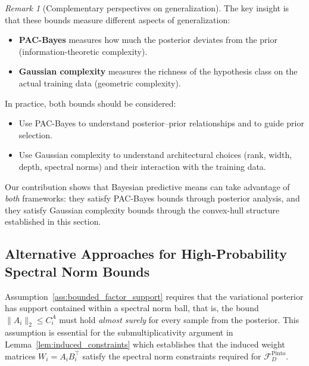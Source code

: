 \documentclass{article}
\theoremstyle{plain}
\theoremstyle{definition}
\theoremstyle{remark}
\newtheorem{remark}[theorem]{Remark}
\begin{document}
\begin{remark}[Complementary perspectives on generalization]
The key insight is that these bounds measure different aspects of generalization:
\begin{itemize}
    \item \textbf{PAC-Bayes} measures how much the posterior deviates from the prior (information-theoretic complexity).
    \item \textbf{Gaussian complexity} measures the richness of the hypothesis class on the actual training data (geometric complexity).
\end{itemize}
In practice, both bounds should be considered:
\begin{itemize}
    \item Use PAC-Bayes to understand posterior--prior relationships and to guide prior selection.
    \item Use Gaussian complexity to understand architectural choices (rank, width, depth, spectral norms) and their interaction with the training data.
\end{itemize}
Our contribution shows that Bayesian predictive means can take advantage of \emph{both} frameworks: they satisfy PAC-Bayes bounds through posterior analysis, and they satisfy Gaussian complexity bounds through the convex-hull structure established in this section.
\end{remark}



\subsection{Alternative Approaches for High-Probability Spectral Norm Bounds}\label{appendix:high_prob_alternatives}

Assumption~\ref{ass:bounded_factor_support} requires that the variational posterior has support contained within a spectral norm ball, that is, the bound $\|A_i\|_2 \leq C_i^A$ must hold \emph{almost surely} for every sample from the posterior. This assumption is essential for the submultiplicativity argument in Lemma~\ref{lem:induced_constraints} which establishes that the induced weight matrices $W_i = A_i B_i^\top$ satisfy the spectral norm constraints required for $\mathcal{F}_D^{\mathrm{Pinto}}$.
\end{document}
